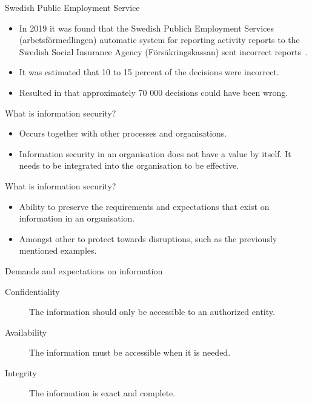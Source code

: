 \documentclass{beamer}
\begin{document}
\begin{frame}{Swedish Public Employment Service}
  \begin{itemize}
    \item In 2019 it was found that the Swedish Publich Employment Services
      (arbetsförmedlingen) automatic system for reporting activity reports to
      the Swedish Social Insurance Agency (Försäkringskassan) sent incorrect
      reports~\cite{SvTPublicEmpl2019}.
    \item It was estimated that 10 to 15 percent of the decisions were incorrect.
    \item Resulted in that approximately 70 000 decisions could have been wrong.
  \end{itemize}
\end{frame}

\begin{frame}{What is information security?}
  \begin{itemize}
    \item Occurs together with other processes and organisations.
    \item Information security in an organisation does not have a value by
      itself. It needs to be integrated into the organisation to be effective.
  \end{itemize}
\end{frame}

\begin{frame}{What is information security?}
  \begin{itemize}
    \item Ability to preserve the requirements and expectations that exist on
      information in an organisation.
    \item Amongst other to protect towards disruptions, such as the previously
      mentioned examples.
  \end{itemize}
\end{frame}

\begin{frame}{Demands and expectations on information}
  \begin{description}
    \item[Confidentiality] The information should only be accessible to an
      authorized entity.

    \item[Availability] The information must be accessible when it is needed.

    \item[Integrity] The information is exact and complete.

  \end{description}
\end{frame}
\end{document}
